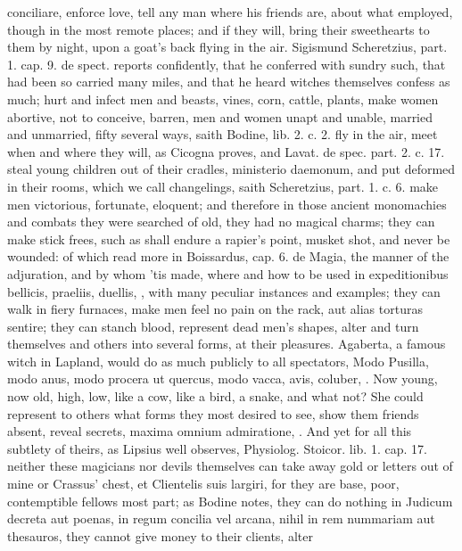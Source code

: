 {conciliare, enforce love, tell any man where his friends are, about
what employed, though in the most remote places; and if they will,
bring their sweethearts to them by night, upon a goat's back
flying in the air. Sigismund Scheretzius, part. 1. cap. 9. de spect.
reports confidently, that he conferred with sundry such, that had been
so carried many miles, and that he heard witches themselves confess as
much; hurt and infect men and beasts, vines, corn, cattle, plants, make
women abortive, not to conceive, barren, men and women unapt and
unable, married and unmarried, fifty several ways, saith Bodine, lib.
2. c. 2. fly in the air, meet when and where they will, as Cicogna
proves, and Lavat. de spec. part. 2. c. 17. steal young children out of
their cradles, ministerio daemonum, and put deformed in their rooms,
which we call changelings, saith Scheretzius, part. 1. c. 6. make
men victorious, fortunate, eloquent; and therefore in those ancient
monomachies and combats they were searched of old, they had no
magical charms; they can make stick frees, such as shall endure a
rapier's point, musket shot, and never be wounded: of which read more
in Boissardus, cap. 6. de Magia, the manner of the adjuration, and by
whom 'tis made, where and how to be used in expeditionibus bellicis,
praeliis, duellis, \etc{}, with many peculiar instances and examples; they
can walk in fiery furnaces, make men feel no pain on the rack, aut
alias torturas sentire; they can stanch blood, represent dead
men's shapes, alter and turn themselves and others into several forms,
at their pleasures. Agaberta, a famous witch in Lapland, would do
as much publicly to all spectators, Modo Pusilla, modo anus, modo
procera ut quercus, modo vacca, avis, coluber, \etc{}. Now young, now old,
high, low, like a cow, like a bird, a snake, and what not? She could
represent to others what forms they most desired to see, show them
friends absent, reveal secrets, maxima omnium admiratione, \etc{}. And yet
for all this subtlety of theirs, as Lipsius well observes, Physiolog.
Stoicor. lib. 1. cap. 17. neither these magicians nor devils themselves
can take away gold or letters out of mine or Crassus' chest, et
Clientelis suis largiri, for they are base, poor, contemptible fellows
most part; as Bodine notes, they can do nothing in Judicum
decreta aut poenas, in regum concilia vel arcana, nihil in rem
nummariam aut thesauros, they cannot give money to their clients, alter
}
